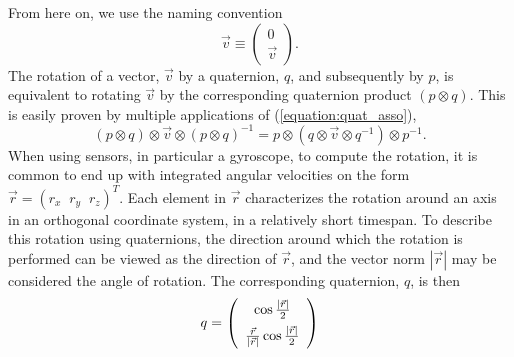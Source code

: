 \documentclass{LTHthesis}
\begin{document}
From here on, we use the naming convention
%
\begin{equation}
\vec v\equiv \left(\begin{array}{c}0\\ \vec{v}\end{array}\right).
\end{equation}
%
The rotation of a vector, $\vec v$ by a quaternion, $q$, and subsequently by $p$, is equivalent to rotating $\vec v$ by the corresponding quaternion product $(p\otimes q)$. This is easily proven by multiple applications of (\ref{equation:quat_asso}),
%
\begin{equation}
(p\otimes q)\otimes \vec v \otimes (p\otimes q)^{-1}=p\otimes(q\otimes\vec v\otimes q^{-1})\otimes p^{-1}. 
\end{equation}
%
When using sensors, in particular a gyroscope, to compute the rotation, it is common to end up with integrated angular velocities on the form $\vec{r} = (r_x \; \; r_y \; \; r_z)^T$. Each element in $\vec r$ characterizes the rotation around an axis in an orthogonal coordinate system, in a relatively short timespan. To describe this rotation using quaternions, the direction around which the rotation is performed can be viewed as the direction of $\vec r$, and the vector norm $|\vec r|$ may be considered the angle of rotation. The corresponding quaternion, $q$, is then
%
\begin{equation}
q = \left(\begin{array}{c}\cos{\frac{|\vec r|}{2}}\vspace{5pt} \\ \frac{\vec{r}}{|\vec r|}\cos{\frac{|\vec r|}{2}}\end{array}\right)
\end{equation}
%
\end{document}
